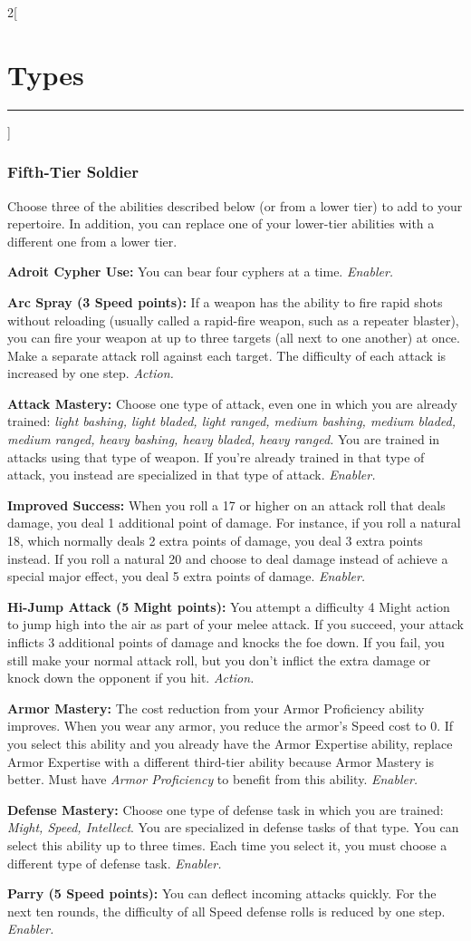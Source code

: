 \documentclass[a4paper,10pt,final]{book}
\newcommand{\HRule}{\rule{\linewidth}{0.5mm}} %
\newcommand{\newSection}[1]{\section*{#1} \addcontentsline{toc}{section}{#1} \label{sec:#1} \HRule}
\newcommand{\itemAbility}[2]{\textcolor{25gray}{\textbullet\textbf{ #1:}} {#2}\par}
\newcommand{\enabler}{\textit{ Enabler.}}
\newcommand{\action}{\textit{ Action.}}
\newenvironment{docsection}[1]
{
  \begin{multicols*}{2}[\newSection{#1}]
}
{
  \end{multicols*}
  \newpage
}
\begin{document}
\begin{docsection}{Types}
\subsubsection*{Fifth-Tier Soldier}
\label{subsub:soldierFifthTier}
Choose three of the abilities described below (or from a lower tier) to add to your repertoire. In addition, you can replace one of your lower-tier abilities with a different one from a lower tier.\par
\itemAbility{Adroit Cypher Use}{You can bear four
cyphers at a time.\enabler}
\itemAbility{Arc Spray (3 Speed points)}{If a weapon
has the ability to fire rapid shots without
reloading (usually called a rapid-fire
weapon, such as a repeater blaster), you
can fire your weapon at up to three targets
(all next to one another) at once. Make a
separate attack roll against each target. The
difficulty of each attack is increased by one
step.\action}
\itemAbility{Attack Mastery}{Choose one
type of attack, even one in which you are
already trained: \textit{light bashing, light bladed,
light ranged, medium bashing, medium
bladed, medium ranged, heavy bashing,
heavy bladed, heavy ranged.} You are
trained in attacks using that type of weapon.
If you’re already trained in that type of
attack, you instead are specialized in that
type of attack.\enabler}
\itemAbility{Improved Success}{When you roll a 17 or
higher on an attack roll that deals damage,
you deal 1 additional point of damage. For
instance, if you roll a natural 18, which
normally deals 2 extra points of damage,
you deal 3 extra points instead. If you roll
a natural 20 and choose to deal damage
instead of achieve a special major effect,
you deal 5 extra points of damage.\enabler}
\itemAbility{Hi-Jump Attack (5 Might points)}{You attempt
a difficulty 4 Might action to jump high into
the air as part of your melee attack. If you
succeed, your attack inflicts 3 additional
points of damage and knocks the foe down.
If you fail, you still make your normal attack
roll, but you don’t inflict the extra damage or
knock down the opponent if you hit.\action}
\itemAbility{Armor Mastery}{The cost reduction
from your Armor Proficiency ability
improves. When you wear any armor, you
reduce the armor’s Speed cost to 0. If you
select this ability and you already have the
Armor Expertise ability, replace
Armor Expertise with a different
third-tier ability because Armor Mastery is better.
Must have \textit{Armor Proficiency} to benefit from this ability.\enabler}
\itemAbility{Defense Mastery}{Choose one
type of defense task in which you are
trained: \textit{Might, Speed, Intellect}. You are
specialized in defense tasks of that type.
You can select this ability up to three times.
Each time you select it, you must choose a
different type of defense task.\enabler}
\itemAbility{Parry (5 Speed points)}{You can deflect
incoming attacks quickly. For the next ten
rounds, the difficulty of all Speed defense
rolls is reduced by one step.\enabler}


\end{docsection}
\end{document}
